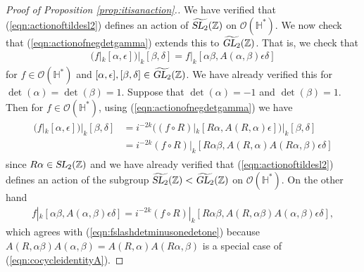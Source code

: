 \documentclass[aps,prd,groupedaddress,preprint,tightenlines,eqsecnum,nofootinbib]{revtex4}
\newcommand{\e}{\epsilon}
\newcommand{\SL}{\operatorname{\textsl{SL}}}      %
\newcommand{\GL}{\operatorname{\textsl{GL}}}      %
\newcommand{\Z}{{\mathbb Z}}%
\newcommand{\HH}{{\mathbb H}}%
\newcommand{\A}{\alpha}
\newcommand{\B}{\beta}
\begin{document}
\begin{proof}[Proof of Proposition \ref{prop:itisanaction}.]
We have verified that (\ref{eqn:actionoftildesl2}) defines an action of $\widetilde{\SL_2}(\Z)$ on $\mathcal{O}(\HH^*)$. We now check that (\ref{eqn:actionofnegdetgamma}) extends this to $\widetilde{\GL_2}(\Z)$. That is, we check that
\begin{gather}\label{eqn:groupactiongl2gl2}
	(f|_k[\A,\e])|_k[\B,\delta] = 
	f|_k[\A\B,A(\A,\B)\e\delta]
\end{gather}
for $f\in \mathcal{O}(\HH^*)$ and $[\A,\e],[\B,\delta]\in \widetilde{\GL_2}(\Z)$. We have already verified this for $\det(\A)=\det(\B)=1$. Suppose that $\det(\A)=-1$ and $\det(\B)=1$. Then for $f\in \mathcal{O}(\HH^*)$, using (\ref{eqn:actionofnegdetgamma}) we have 
\begin{gather}
\begin{split}\label{eqn:fslashdetminusonedetone}
(f|_k[\A,\e])|_k[\B,\delta]&=i^{-2k}((f\circ R)|_k[R\A,A(R,\A)\e])|_k[\B,\delta]\\
&=i^{-2k}(f\circ R)|_k[R\A\B,A(R,\A)A(R\A,\B)\e\delta]
\end{split}
\end{gather}
since $R\A\in\SL_2(\Z)$ and we have already verified that (\ref{eqn:actionoftildesl2}) defines an action of the subgroup $\widetilde{\SL_2}(\Z)<\widetilde{\GL_2}(\Z)$ on $\mathcal{O}(\HH^*)$. On the other hand 
\begin{gather}
f|_k[\A\B,A(\A,\B)\e\delta]=i^{-2k}(f\circ R)|_k[R\A\B,A(R,\A\B)A(\A,\B)\e\delta], 
\end{gather}
which agrees with (\ref{eqn:fslashdetminusonedetone}) because $A(R,\A\B)A(\A,\B)=A(R,\A)A(R\A,\B)$ is a special case of (\ref{eqn:cocycleidentityA}).


\end{proof}
\end{document}
